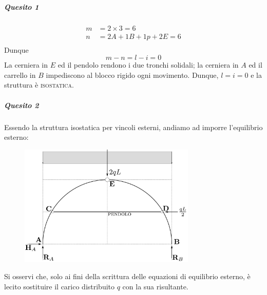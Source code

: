 \subparagraph{Quesito 1}
\begin{align*}
m &= 2\times 3 = 6 \\ 
n  &= 2A + 1B + 1p + 2E = 6 \\
\end{align*}
Dunque
\begin{equation*}
m - n = l - i = 0
\end{equation*}
La cerniera in $E$ ed il pendolo rendono i due tronchi solidali; la cerniera in $A$ ed il carrello in $B$ impediscono al blocco rigido ogni movimento. Dunque, $l=i=0$ e la struttura è \textsc{isostatica}.
\subparagraph{Quesito 2}
Essendo la struttura isostatica per vincoli esterni, andiamo ad imporre l'equilibrio esterno: 
\renewcommand{\thefigure}{11.1~-~2}
\begin{figure}[ht]
\centering
\includegraphics[width=0.75\textwidth]{Immagini/Parte_11/Esercizio11_1_1/esercizio11_1_2.pdf}
\caption{}
\label{Esercizio11-1-2}
\end{figure}
Si osservi che, solo ai fini della scrittura delle equazioni di equilibrio esterno, è lecito sostituire il carico distribuito $q$ con la sua risultante. 
